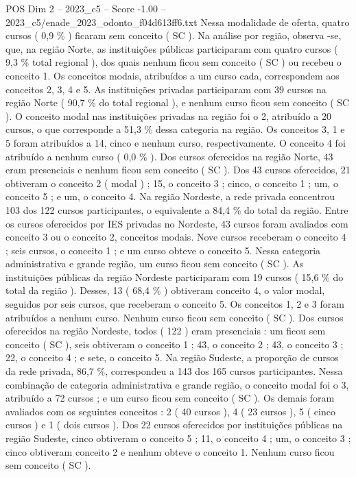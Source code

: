 \begin{textsample}{POS Dim 2 – 2023\_c5 – Score -1.00 – 2023\_c5/enade\_2023\_odonto\_f04d613ff6.txt}
Nessa modalidade de oferta, quatro cursos ( 0,9 \% ) ficaram sem conceito ( SC ).
Na análise por região, observa -se, que, na região Norte, as instituições públicas participaram com quatro cursos ( 9,3 \% total regional ), dos quais nenhum ficou sem conceito ( SC ) ou recebeu o conceito 1.
Os conceitos modais, atribuídos a um curso cada, correspondem aos conceitos 2, 3, 4 e 5.
As instituições privadas participaram com 39 cursos na região Norte ( 90,7 \% do total regional ), e nenhum curso ficou sem conceito ( SC ).
O conceito modal nas instituições privadas na região foi o 2, atribuído a 20 cursos, o que corresponde a 51,3 \% dessa categoria na região.
Os conceitos 3, 1 e 5 foram atribuídos a 14, cinco e nenhum curso, respectivamente.
O conceito 4 foi atribuído a nenhum curso ( 0,0 \% ).
Dos cursos oferecidos na região Norte, 43 eram presenciais e nenhum ficou sem conceito ( SC ).
Dos 43 cursos oferecidos, 21 obtiveram o conceito 2 ( modal ) ; 15, o conceito 3 ; cinco, o conceito 1 ; um, o conceito 5 ; e um, o conceito 4.
Na região Nordeste, a rede privada concentrou 103 dos 122 cursos participantes, o equivalente a 84,4 \% do total da região.
Entre os cursos oferecidos por IES privadas no Nordeste, 43 cursos foram avaliados com conceito 3 ou o conceito 2, conceitos modais.
Nove cursos receberam o conceito 4 ; seis cursos, o conceito 1 ; e um curso obteve o conceito 5.
Nessa categoria administrativa e grande região, um curso ficou sem conceito ( SC ).
As instituições públicas da região Nordeste participaram com 19 cursos ( 15,6 \% do total da região ).
Desses, 13 ( 68,4 \% ) obtiveram conceito 4, o valor modal, seguidos por seis cursos, que receberam o conceito 5.
Os conceitos 1, 2 e 3 foram atribuídos a nenhum curso.
Nenhum curso ficou sem conceito ( SC ).
Dos cursos oferecidos na região Nordeste, todos ( 122 ) eram presenciais : um ficou sem conceito ( SC ), seis obtiveram o conceito 1 ; 43, o conceito 2 ; 43, o conceito 3 ; 22, o conceito 4 ; e sete, o conceito 5.
Na região Sudeste, a proporção de cursos da rede privada, 86,7 \%, correspondeu a 143 dos 165 cursos participantes.
Nessa combinação de categoria administrativa e grande região, o conceito modal foi o 3, atribuído a 72 cursos ; e um curso ficou sem conceito ( SC ).
Os demais foram avaliados com os seguintes conceitos : 2 ( 40 cursos ), 4 ( 23 cursos ), 5 ( cinco cursos ) e 1 ( dois cursos ).
Dos 22 cursos oferecidos por instituições públicas na região Sudeste, cinco obtiveram o conceito 5 ; 11, o conceito 4 ; um, o conceito 3 ; cinco obtiveram conceito 2 e nenhum obteve o conceito 1.
Nenhum curso ficou sem conceito ( SC ).

\end{textsample}
